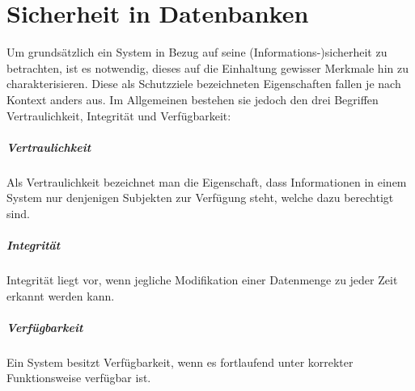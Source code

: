 \chapter{Sicherheit in Datenbanken}
Um grundsätzlich ein System in Bezug auf seine (Informations-)sicherheit zu betrachten, ist es notwendig, dieses auf die Einhaltung gewisser Merkmale hin zu charakterisieren. Diese als Schutzziele bezeichneten Eigenschaften fallen je nach Kontext anders aus. Im Allgemeinen bestehen sie jedoch den drei Begriffen Vertraulichkeit, Integrität und Verfügbarkeit:

\paragraph{Vertraulichkeit}
Als Vertraulichkeit bezeichnet man die Eigenschaft, dass Informationen in einem System nur denjenigen Subjekten zur Verfügung steht, welche dazu berechtigt sind.

\paragraph{Integrität}
Integrität liegt vor, wenn jegliche Modifikation einer Datenmenge zu jeder Zeit erkannt werden kann.

\paragraph{Verfügbarkeit}
Ein System besitzt Verfügbarkeit, wenn es fortlaufend unter korrekter Funktionsweise verfügbar ist.


